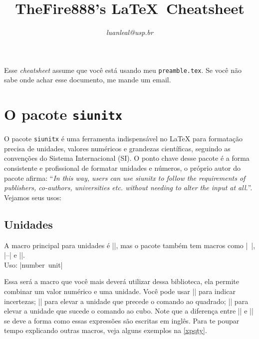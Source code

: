 \documentclass{ltxdoc}
\title{TheFire888's \LaTeX\ Cheatsheet}
\author{\textit{luanleal@usp.br}}
\date{}
\begin{document}
\maketitle

Esse \textit{cheatsheet} assume que você está usando meu
\texttt{preamble.tex}. Se você não sabe onde achar esse documento, me
mande um email.

\section{O pacote \texttt{siunitx}}
O pacote \texttt{siunitx} é uma ferramenta indispensável no LaTeX para
formatação precisa de unidades, valores numéricos e grandezas
científicas, seguindo as convenções do Sistema Internacional (SI). O
ponto chave desse pacote é a forma consistente e profissional de
formatar unidades e números, o próprio autor do pacote afirma:
``\textit{In this way, users can use siunitx to follow the
    requirements of publishers, co-authors, universities etc. without
    needing to alter the input at all.}''. Vejamos seus usos:

\subsection{Unidades}
A macro principal para unidades é |\qty{}{}|, mas o pacote também tem
macros como |\qtylist{}{}|, |\qtyrange{}{}{}| e
|\unit{}|. \\

\DescribeMacro{\qty{}{}} Uso: |\qty{number}{unit}|

Essa será a macro que você mais deverá utilizar dessa
biblioteca, ela permite combinar um valor numérico e uma unidade. Você
pode usar |\pm| para indicar incertezas; |\squared| para elevar a
unidade que precede o comando ao quadrado; |\cubic| para elevar a
unidade que sucede o comando ao cubo. Note que a diferença entre
|\squared| e |\cubic| se deve a forma como essas expressões são
escritas em inglês. Para te poupar tempo explicando outras macros,
veja alguns exemplos na \cref{xpqty}.
\end{document}

